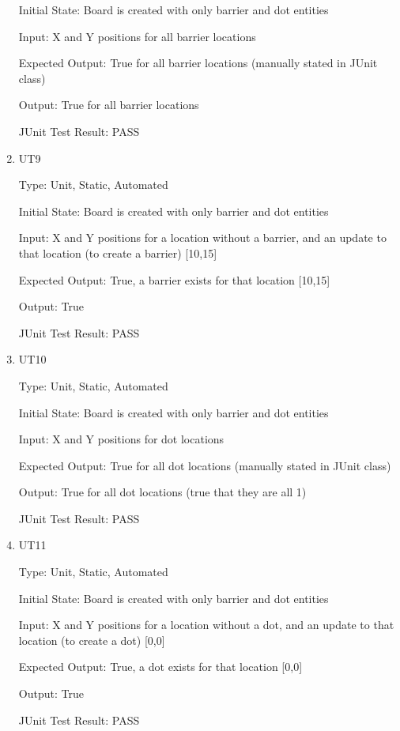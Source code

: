 \documentclass[12pt, titlepage]{article}
\begin{document}
\begin{enumerate}
Initial State: Board is created with only barrier and dot entities
					
Input: X and Y positions for all barrier locations
					
Expected Output: True for all barrier locations (manually stated in JUnit class)
					
Output: True for all barrier locations

JUnit Test Result: PASS

\item{UT9\\}

Type: Unit, Static, Automated
					
Initial State: Board is created with only barrier and dot entities
					
Input: X and Y positions for a location without a barrier, and an update to that location (to create a barrier) [10,15]
					
Expected Output: True, a barrier exists for that location [10,15]
					
Output: True

JUnit Test Result: PASS

\item{UT10\\}

Type: Unit, Static, Automated
					
Initial State: Board is created with only barrier and dot entities
					
Input: X and Y positions for dot locations
					
Expected Output: True for all dot locations (manually stated in JUnit class)
					
Output: True for all dot locations (true that they are all 1)

JUnit Test Result: PASS

\item{UT11\\}

Type: Unit, Static, Automated
					
Initial State: Board is created with only barrier and dot entities
					
Input: X and Y positions for a location without a dot, and an update to that location (to create a dot) [0,0]
					
Expected Output: True, a dot exists for that location [0,0]
					
Output: True

JUnit Test Result: PASS


\end{enumerate}
\end{document}
